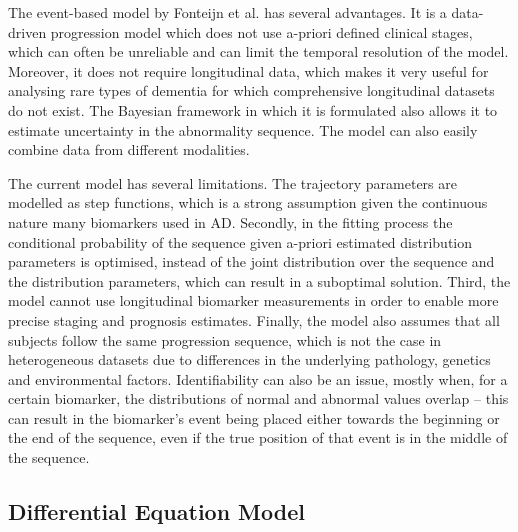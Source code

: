 The event-based model by Fonteijn et al. \cite{fonteijn2012event} has several advantages. It is a data-driven progression model which does not use a-priori defined clinical stages, which can often be unreliable and can limit the temporal resolution of the model. Moreover, it does not require longitudinal data, which makes it very useful for analysing rare types of dementia for which comprehensive longitudinal datasets do not exist. The Bayesian framework in which it is formulated also allows it to estimate uncertainty in the abnormality sequence. The model can also easily combine data from different modalities.  

The current model has several limitations. The trajectory parameters are modelled as step functions, which is a strong assumption given the continuous nature many biomarkers used in AD. Secondly, in the fitting process the conditional probability of the sequence given a-priori estimated distribution parameters is optimised, instead of the joint distribution over the sequence and the distribution parameters, which can result in a suboptimal solution. Third, the model cannot use longitudinal biomarker  measurements in order to enable more precise staging and prognosis estimates.  Finally, the model also assumes that all subjects follow the same progression sequence, which is not the case in heterogeneous datasets due to differences in the underlying pathology, genetics and environmental factors. Identifiability can also be an issue, mostly when, for a certain biomarker, the distributions of normal and abnormal values overlap -- this can result in the biomarker's event being placed either towards the beginning or the end of the sequence, even if the true position of that event is in the middle of the sequence.


\subsection{Differential Equation Model}
\label{sec:bckDem}


